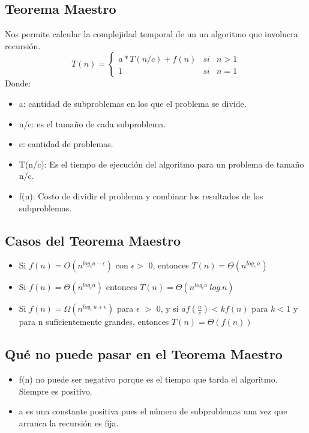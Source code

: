 \documentclass[10pt,a4paper]{article}
\begin{document}
\subsection*{Teorema Maestro}
Nos permite calcular la complejidad temporal de un un algoritmo que involucra recursión.
\[T(n) = \left\{ \begin{array}{lcc} a \ast T(n/c) + f(n) & si & n>1  \\ 1 & si & n=1 \end{array} \right.\]
Donde: 
\begin{itemize}
    \item a: cantidad de subproblemas en los que el problema se divide.
    \item n/c: es el tamaño de cada subproblema.
    \item c: cantidad de problemas.
    \item T(n/c): Es el tiempo de ejecución del algoritmo para un problema de tamaño n/c.
    \item f(n): Costo de dividir el problema y combinar los resultados de los subproblemas.
\end{itemize}
\subsection*{Casos del Teorema Maestro}
\begin{itemize}
    \item Si $f(n) = O(n^{log_{c} a-\epsilon})$ con $\epsilon >$ 0, entonces $T(n) = \Theta(n^{log_{c} \ a})$
    \item Si $f(n) = \Theta(n^{log_{c} a})$ entonces $T(n) = \Theta(n^{log_{c} a} \ log \ n)$
    \item Si $f(n) = \Omega(n^{log_{c} \ a + \epsilon})$ para $\epsilon$ $>$ 0, y si $ af(\frac{n}{c}) < kf(n)$ para $k<1$ y para n suficientemente grandes, entonces $T(n) = \Theta(f(n))$
\end{itemize}
\subsection*{Qué no puede pasar en el Teorema Maestro}
\begin{itemize}
    \item f(n) no puede ser negativo porque es el tiempo que tarda el algoritmo. Siempre es positivo.
    \item a es una constante positiva pues el número de subproblemas una vez que arranca la recursión es fija.
\end{itemize}
\end{document}

